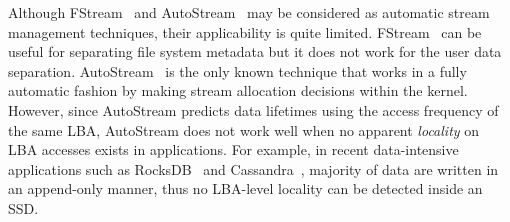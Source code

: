 Although \textsf{\small FStream}~\cite{FStream} and \textsf{\small AutoStream}~\cite{AutoStream}
may be considered 
as automatic stream management techniques,
their applicability is quite limited.
\textsf{\small FStream}~\cite{FStream} can be useful for separating file system metadata but it does not
work for the user data separation.
\textsf{\small AutoStream}~\cite{AutoStream} is the only known technique that works in a 
fully automatic fashion by making stream allocation decisions within 
the kernel.
However, since \textsf{\small AutoStream} predicts data lifetimes using the
access frequency of the same LBA, \textsf{\small AutoStream} does not work well 
when no apparent {\it locality} on LBA accesses exists in applications.  
For example, in recent data-intensive applications 
such as RocksDB~\cite{RocksDB} and Cassandra~\cite{Cassandra}, 
majority of data are written in an append-only manner,
thus no LBA-level locality can be detected inside an SSD.


